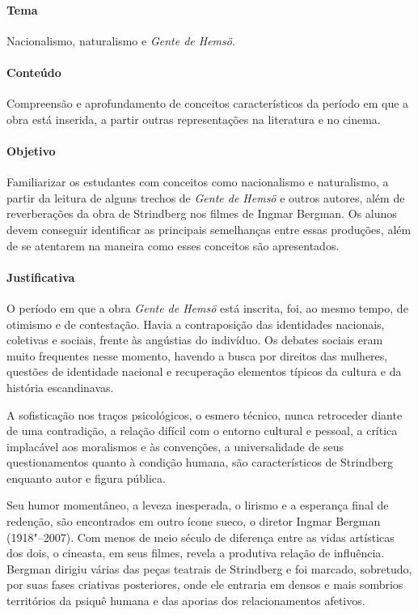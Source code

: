 \documentclass[12pt]{extarticle}
\begin{document}
\paragraph{Tema} Nacionalismo, naturalismo e \emph{Gente de Hemsö}.

\paragraph{Conteúdo} Compreensão e aprofundamento de conceitos 
característicos da período em que a obra está inserida, a partir outras representações na literatura e no cinema. 

\paragraph{Objetivo} Familiarizar os estudantes com conceitos como 
nacionalismo e naturalismo, a partir da leitura de alguns trechos de 
\emph{Gente de Hemsö} e outros autores, além de reverberações da obra de 
Strindberg nos filmes de Ingmar Bergman. 
Os alunos devem conseguir identificar as principais semelhanças entre 
essas produções, além de se atentarem na maneira como esses conceitos são apresentados. 


\paragraph{Justificativa} O período em que a obra \emph{Gente de Hemsö} 
está inscrita, foi, ao mesmo tempo, de otimismo e de contestação. Havia a contraposição das identidades nacionais, 
coletivas e sociais, frente às angústias do indivíduo. Os debates sociais 
eram muito frequentes nesse momento, havendo a busca por direitos das 
mulheres, questões de identidade nacional e recuperação elementos típicos 
da cultura e da história escandinavas.

A sofisticação nos traços psicológicos, o esmero técnico, nunca retroceder 
diante de uma contradição, a relação difícil com o entorno cultural e 
pessoal, a crítica implacável aos moralismos e às convenções, a 
universalidade de seus questionamentos quanto à condição humana, são 
característicos de Strindberg enquanto autor e figura pública. 

Seu humor momentâneo, a leveza inesperada, o lirismo e a esperança final 
de redenção, são encontrados em outro ícone sueco, o diretor Ingmar Bergman (1918"--2007). Com menos de meio século de diferença entre as vidas 
artísticas dos dois, o cineasta, em seus filmes, revela a produtiva 
relação de influência. Bergman dirigiu várias das peças teatrais de
Strindberg e foi marcado, sobretudo, por suas fases criativas
posteriores, onde ele entraria em densos e mais sombrios
territórios da psiquê humana e das aporias dos relacionamentos
afetivos.
\end{document}
